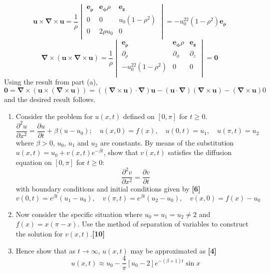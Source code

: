 \documentclass[a4paper]{article}
\begin{document}
\begin{ans}
\begin{enumerate}[label=(\alph*)]
$$\mathbf{u}\times\boldsymbol{\nabla}\times\mathbf{u}=\frac{1}{\rho}\begin{vmatrix}\boldsymbol{e_\rho}&\boldsymbol{e_\phi}\rho&\boldsymbol{e_z}\\0&0&u_0(1-\rho^2)\\0&2 \rho u_0&0\\\end{vmatrix}=-u_0^22(1-\rho^2)\boldsymbol{e_\rho}$$
$$\boldsymbol{\nabla}\times(\mathbf{u}\times\boldsymbol{\nabla}\times\mathbf{u})=\frac{1}{\rho}\begin{vmatrix}\boldsymbol{e_\rho}&\boldsymbol{e_\phi}\rho&\boldsymbol{e_z}\\\partial_\rho&\partial_\phi&\partial_z\\-u_0^22(1-\rho^2)&0&0\\\end{vmatrix}=\boldsymbol{0}$$
Using the result from part (a),
$$\boldsymbol{0}=\boldsymbol{\nabla}\times(\mathbf{u}\times(\boldsymbol{\nabla}\times\mathbf{u}))=((\boldsymbol{\nabla}\times\mathbf{u})\cdot\boldsymbol{\nabla})\mathbf{u}-(\mathbf{u}\cdot\boldsymbol{\nabla})(\boldsymbol{\nabla}\times\mathbf{u})-(\boldsymbol{\nabla}\times\mathbf{u})0$$
and the desired result follows.
\end{enumerate}
\end{ans}
\newpage
\begin{qns}\leavevmode
\begin{enumerate}[label=(\alph*)]
    \item Consider the problem for $u(x,t)$ defined on $[0,\pi]$ for $t\geq0$.
$$\frac{\partial^2u}{\partial x^2}=\frac{\partial u}{\partial t}+\beta(u-u_0);\quad u(x,0)=f(x),\quad u(0,t)=u_1,\quad u(\pi,t)=u_2$$
where $\beta>0$, $u_0$, $u_1$ and $u_2$ are constants. By means of the substitution $u(x,t)=u_0+v(x,t)e^{-\beta t}$, show that $v(x,t)$ satisfies the diffusion equation on $[0,\pi]$ for $t\geq0$:
$$\frac{\partial^2v}{\partial x^2}=\frac{\partial v}{\partial t}$$
with boundary conditions and initial conditions given by \hfill \textbf{[6]}
$$v(0,t)=e^{\beta t}(u_1-u_0),\quad v(\pi,t)=e^{\beta t}(u_2-u_0),\quad v(x,0)=f(x)-u_0$$
\item Now consider the specific situation where $u_0=u_1=u_2\neq2$ and $f(x)=x(\pi-x)$. Use the method of separation of variables to construct the solution for $v(x,t)$.\hfill \textbf{[10]}
\item Hence show that as $t\rightarrow\infty$, $u(x,t)$ may be approximated as \hfill \textbf{[4]}
$$u(x,t)\approx u_0-\frac{4}{\pi}[u_0-2]e^{-(\beta+1)t}\sin x$$
\end{enumerate}
\end{qns}
\end{document}
